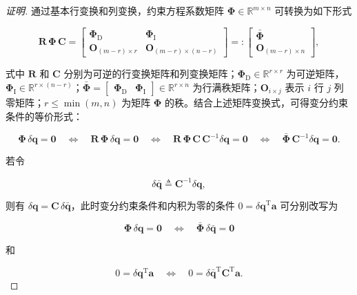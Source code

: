 \begin{proof}[证明]
通过基本行变换和列变换，约束方程系数矩阵 $\boldsymbol{\Phi}\in\mathbb{R}^{m\times n}$ 可转换为如下形式

\[
\boldsymbol{R}\,\boldsymbol{\Phi}\,\boldsymbol{C}=\begin{bmatrix}\boldsymbol{\Phi}_{\mathrm{D}}&\boldsymbol{\Phi}_{\mathrm{I}}\\\boldsymbol{O}_{(m-r)\times r}&\boldsymbol{O}_{(m-r)\times(n-r)}\end{bmatrix}=:\begin{bmatrix}\bar{\boldsymbol{\Phi}}\\\boldsymbol{O}_{(m-r)\times n}\end{bmatrix},
\]

式中 $\boldsymbol{R}$ 和 $\boldsymbol{C}$ 分别为可逆的行变换矩阵和列变换矩阵；$\boldsymbol{\Phi}_{\mathrm{D}}\in\mathbb{R}^{r\times r}$ 为可逆矩阵，$\boldsymbol{\Phi}_{\mathrm{I}}\in\mathbb{R}^{r\times(n-r)}$；$\bar{\boldsymbol{\Phi}}=\begin{bmatrix}\boldsymbol{\Phi}_{\mathrm{D}}&\boldsymbol{\Phi}_{\mathrm{I}}\end{bmatrix}\in\mathbb{R}^{r\times n}$ 为行满秩矩阵；$\boldsymbol{O}_{i\times j}$ 表示 $i$ 行 $j$ 列零矩阵；$r\leq\min(m,n)$ 为矩阵 $\boldsymbol{\Phi}$ 的秩。结合上述矩阵变换式，可得变分约束条件的等价形式：

\[
\boldsymbol{\Phi}\,\delta\boldsymbol{q}=\boldsymbol{0}\quad\Leftrightarrow\quad\boldsymbol{R}\,\boldsymbol{\Phi}\,\delta\boldsymbol{q}=\boldsymbol{0}\quad\Leftrightarrow\quad\boldsymbol{R}\,\boldsymbol{\Phi}\,\boldsymbol{C}\,\boldsymbol{C}^{-1}\delta\boldsymbol{q}=\boldsymbol{0}\quad\Leftrightarrow\quad\bar{\boldsymbol{\Phi}}\,\boldsymbol{C}^{-1}\delta\boldsymbol{q}=\boldsymbol{0}.
\]

若令

\[
\delta\bar{\boldsymbol{q}}\triangleq\boldsymbol{C}^{-1}\delta\boldsymbol{q},
\]

则有 $\delta\boldsymbol{q}=\boldsymbol{C}\,\delta\bar{\boldsymbol{q}}$，此时变分约束条件和内积为零的条件 $0=\delta\boldsymbol{q}^{\mathrm{T}}\boldsymbol{a}$ 可分别改写为

\[
\boldsymbol{\Phi}\,\delta\boldsymbol{q}=\boldsymbol{0}\quad\Leftrightarrow\quad\bar{\boldsymbol{\Phi}}\,\delta\bar{\boldsymbol{q}}=\boldsymbol{0}
\]

和

\[
0=\delta\boldsymbol{q}^{\mathrm{T}}\boldsymbol{a}\quad\Leftrightarrow\quad0=\delta\bar{\boldsymbol{q}}^{\mathrm{T}}\boldsymbol{C}^{\mathrm{T}}\boldsymbol{a}.
\]


\end{proof}
